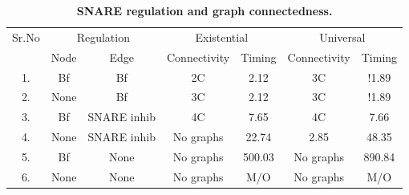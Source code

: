 \begin{table}[t]
	\centering
	\caption{{\bf SNARE regulation and graph connectedness.}}
		\begin{tabular}[t]{|c|c|c|c|c|c|c|}\hline
			
			{\multirow{2}{*} {Sr.No}}  & \multicolumn{2}{c|}{Regulation} & \multicolumn{2}{c|}{Existential} & \multicolumn{2}{c|}{Universal} 
			
			

			
			\\\cline{2-7}
			{} & {Node} & {Edge} & {Connectivity} & {Timing} & {Connectivity} & {Timing}
			
			\\\hline
			1. & Bf & Bf & 2C & 2.12 & 3C & \cellcolor{red!25}!1.89  \\\hline
			2. & None & Bf & 3C & 2.12 & 3C & \cellcolor{red!25}!1.89  \\\hline
			3. & Bf & SNARE inhib & 4C & 7.65 & 4C & 7.66 \\\hline
			4. & None & SNARE inhib & No graphs & 22.74 & 2.85 & 48.35 \\\hline
			5. & Bf & None & No graphs & 500.03 & No graphs & 890.84 \\\hline
			6. &  None & None & No graphs  & M/O & No graphs & M/O \\\hline
			
	\end{tabular}
	\label{tab:sat-graph}
\end{table}